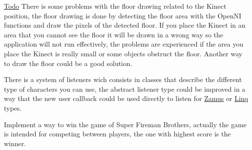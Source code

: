  \begin{Desc}
\item[\hyperlink{todo__todo000001}{Todo}]There is some problems with the floor drawing related to the Kinect position, the floor drawing is done by detecting the floor area with the OpenNI functions and draw the pixels of the detected floor. If you place the Kinect in an area that you cannot see the floor it will be drawn in a wrong way so the application will not run effectively, the problems are experienced if the area you place the Kinect is really small or some objects obstruct the floor. Another way to draw the floor could be a good solution. 

There is a system of listeners wich consists in classes that describe the different type of characters you can use, the abstract listener type could be improved in a way that the new user callback could be used directly to listen for \hyperlink{classZamus}{Zamus} or \hyperlink{classLinq}{Linq} types. 

Implement a way to win the game of Super Fireman Brothers, actually the game is intended for competing between players, the one with highest score is the winner. \end{Desc}
